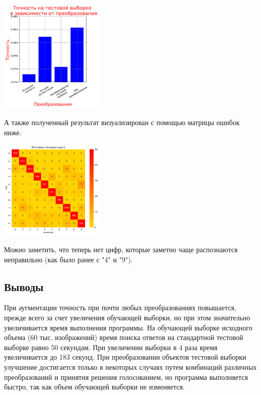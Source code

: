 \documentclass{article}
\begin{document}
\begin{itemize}
    
    \begin{center}
        \includegraphics[width=5cm]{TASK1 PRAC сравнение.pdf}
    \end{center}
    
    А также полученный результат визуализирован с помощью матрицы ошибок ниже.
    \begin{center}
        \includegraphics[width=5cm]{TASK1 end.pdf}
    \end{center}
    
Можно заметить, что теперь нет цифр, которые заметно чаще распознаются неправильно (как было ранее с "4"{ }и "9").
\end{itemize}


\subsection{Выводы}

При аугментации точность при почти любых преобразованиях повышается, прежде всего за счет увеличения обучающей выборки, но при этом значительно увеличивается время выполнения программы. На обучающей выборке исходного объема (60 тыс. изображений) время поиска ответов на стандартной тестовой выборке равно 50 секундам. При увеличении выборки в 4 раза время увеличивается до 183 секунд. При преобразовании объектов тестовой выборки улучшение достигается только в некоторых случаях путем комбинаций различных преобразований и принятия решения голосованием, но программа выполняется быстро, так как объем обучающей выборки не изменяется. 
\end{document}
